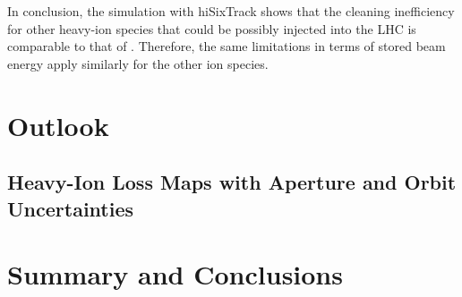  

In conclusion, the simulation with hiSixTrack shows that the cleaning inefficiency for other heavy-ion species that could be possibly injected into the LHC is comparable to that of \lead. Therefore, the same limitations in terms of stored beam energy apply similarly for the other ion species. 


\chapter{Outlook}



\subsection{}



\section{Heavy-Ion Loss Maps with Aperture and Orbit Uncertainties}



\chapter{Summary and Conclusions}